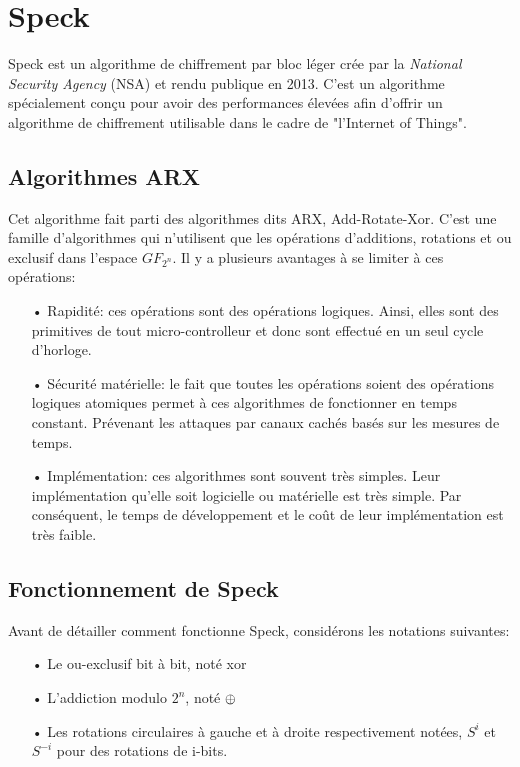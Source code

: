 
		\section{Speck}

			Speck est un algorithme de chiffrement par bloc léger crée par la
		\textit{National Security Agency} (NSA) et rendu
		publique en 2013. C'est un algorithme spécialement conçu pour avoir des performances
		élevées afin d'offrir un algorithme de chiffrement utilisable dans le cadre de
		"l'Internet of Things".

		\subsection{Algorithmes ARX}

				Cet algorithme fait parti des algorithmes dits ARX, Add-Rotate-Xor. C'est une famille
			d'algorithmes qui n'utilisent que les opérations d'additions, rotations et ou exclusif
			dans l'espace $GF_{2^n}$. Il y a plusieurs avantages à se limiter à ces opérations:

			\begin{enumerate}
			\item[•] Rapidité: ces opérations sont des opérations logiques. Ainsi, elles sont
				des primitives de tout micro-controlleur et donc sont effectué en un seul
				cycle d'horloge.
			\item[•] Sécurité matérielle: le fait que toutes les opérations soient des opérations
				logiques atomiques permet à ces algorithmes de fonctionner en temps constant.
				Prévenant les attaques par canaux cachés basés sur les mesures de temps.
			\item[•] Implémentation: ces algorithmes sont souvent très simples. Leur implémentation
				qu'elle soit logicielle ou matérielle est très simple. Par conséquent, le
				temps de développement et le coût de leur implémentation est très faible.
			\end{enumerate}

		\subsection{Fonctionnement de Speck}

			Avant de détailler comment fonctionne Speck, considérons les notations suivantes:

			\begin{enumerate}
			  \item[•] Le ou-exclusif bit à bit, noté xor
			  \item[•] L'addiction modulo $2^n$, noté $\mathbin{\oplus}$
			  \item[•] Les rotations circulaires à gauche et à droite respectivement notées,
			    $S^i$ et $S^{-i}$ pour des rotations de i-bits.
			\end{enumerate}


